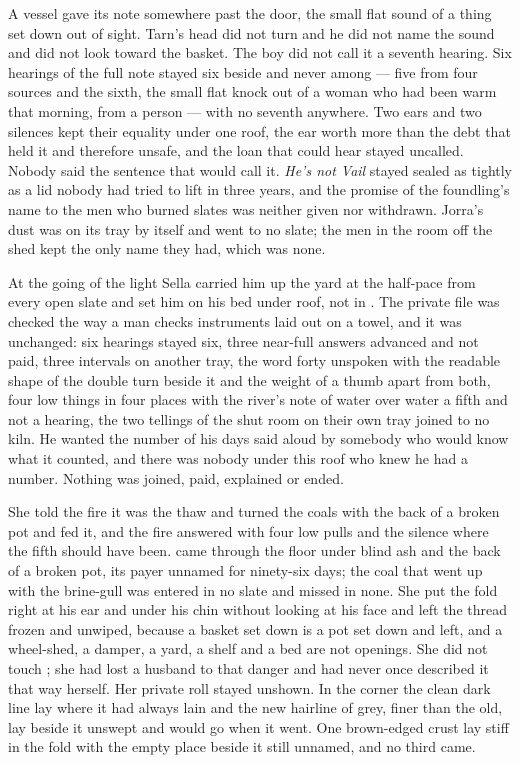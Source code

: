 A vessel gave its note somewhere past the door, the small flat sound of a thing set down out of sight. Tarn's head did not turn and he did not name the sound and did not look toward the basket. The boy did not call it a seventh hearing. Six hearings of the full note stayed six beside and never among --- five from four sources and the sixth, the small flat knock out of a woman who had been warm that morning, from a person --- with no seventh anywhere. Two ears and two silences kept their equality under one roof, the ear worth more than the debt that held it and therefore unsafe, and the loan that could hear stayed uncalled. Nobody said the sentence that would call it. \emph{He's not Vail} stayed sealed as tightly as a lid nobody had tried to lift in three years, and the promise of the foundling's name to the men who burned slates was neither given nor withdrawn. Jorra's dust was on its tray by itself and went to no slate; the men in the room off the shed kept the only name they had, which was none.

\scenebreak

At the going of the light Sella carried him up the yard at the half-pace from every open slate and set him on his bed under  roof, not in . The private file was checked the way a man checks instruments laid out on a towel, and it was unchanged: six hearings stayed six, three near-full answers advanced and not paid, three intervals on another tray, the word forty unspoken with the readable shape of the double turn beside it and the weight of a thumb apart from both, four low things in four places with the river's note of water over water a fifth and not a hearing, the two tellings of the shut room on their own tray joined to no kiln. He wanted the number of his days said aloud by somebody who would know what it counted, and there was nobody under this roof who knew he had a number. Nothing was joined, paid, explained or ended.

She told the fire it was the thaw and turned the coals with the back of a broken pot and fed it, and the fire answered with four low pulls and the silence where the fifth should have been.  came through the floor under blind ash and the back of a broken pot, its payer unnamed for ninety-six days; the coal that went up with the brine-gull was entered in no slate and missed in none. She put the fold right at his ear and under his chin without looking at his face and left the thread frozen and unwiped, because a basket set down is a pot set down and left, and a wheel-shed, a damper, a yard, a shelf and a bed are not openings. She did not touch ; she had lost a husband to that danger and had never once described it that way herself. Her private roll stayed unshown. In the corner the clean dark line lay where it had always lain and the new hairline of grey, finer than the old, lay beside it unswept and would go when it went. One brown-edged crust lay stiff in the fold with the empty place beside it still unnamed, and no third came.

